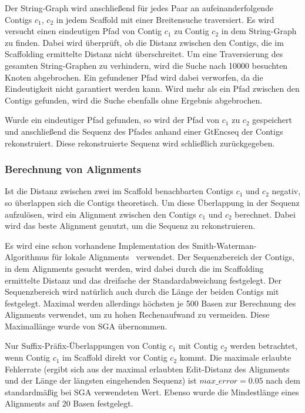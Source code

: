 \documentclass[a4paper,10pt,parskip]{scrartcl}
\begin{document}
Der String-Graph wird anschließend für jedes Paar an
aufeinanderfolgende Contigs $c_1$, $c_2$ in jedem Scaffold mit einer
Breitensuche traversiert. Es wird versucht einen eindeutigen Pfad von
Contig $c_1$ zu Contig $c_2$ in dem String-Graph zu finden. Dabei wird
überprüft, ob die Distanz zwischen den Contigs, die im Scaffolding
ermittelte Distanz nicht überschreitet. Um eine Traversierung des
gesamten String-Graphen zu verhindern, wird die Suche nach \num{10000}
besuchten Knoten abgebrochen. Ein gefundener Pfad wird dabei
verworfen, da die Eindeutigkeit nicht garantiert werden kann. Wird
mehr als ein Pfad zwischen den Contigs gefunden, wird die Suche
ebenfalls ohne Ergebnis abgebrochen.

Wurde ein eindeutiger Pfad gefunden, so wird der Pfad von $c_1$ zu
$c_2$ gespeichert und anschließend die Sequenz des Pfades anhand einer
GtEncseq der Contigs rekonstruiert. Diese rekonstruierte Sequenz wird
schließlich zurückgegeben.

\subsubsection{Berechnung von Alignments}
Ist die Distanz zwischen zwei im Scaffold benachbarten Contigs $c_1$
und $c_2$ negativ, so überlappen sich die Contigs theoretisch. Um
diese Überlappung in der Sequenz aufzulösen, wird ein Alignment
zwischen den Contigs $c_1$ und $c_2$ berechnet. Dabei wird das beste
Alignment genutzt, um die Sequenz zu rekonstruieren.

Es wird eine schon vorhandene Implementation des
Smith-Waterman-Algorithmus für lokale Alignments~\cite{smith}
verwendet. Der Sequenzbereich der Contigs, in dem Alignments gesucht
werden, wird dabei durch die im Scaffolding ermittelte Distanz und das
dreifache der Standardabweichung festgelegt. Der Sequenzbereich wird
natürlich auch durch die Länge der beiden Contigs mit
festgelegt. Maximal werden allerdings höchsten je 500 Basen zur
Berechnung des Alignments verwendet, um zu hohen Rechenaufwand zu
vermeiden. Diese Maximallänge wurde von SGA übernommen.

Nur Suffix-Präfix-Überlappungen von Contig $c_1$ mit Contig $c_2$
werden betrachtet, wenn Contig $c_1$ im Scaffold direkt vor Contig
$c_2$ kommt. Die maximale erlaubte Fehlerrate (ergibt sich aus der
maximal erlaubten Edit-Distanz des Alignments und der Länge der
längsten eingehenden Sequenz) ist $max\_error = 0.05$ nach dem
standardmäßig bei SGA verwendeten Wert. Ebenso wurde die Mindestlänge
eines Alignments auf 20 Basen festgelegt.
\end{document}
